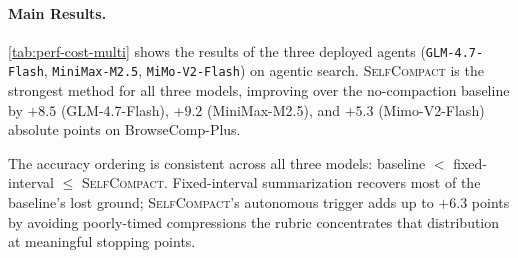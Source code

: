 \documentclass{article}
\newcommand{\method}{\textsc{{SelfCompact}}}
\begin{document}
\paragraph{Main Results.} \autoref{tab:perf-cost-multi} shows the results of the three deployed agents (\texttt{GLM-4.7-Flash}, \texttt{MiniMax-M2.5}, \texttt{MiMo-V2-Flash}) on agentic search. \method{} is the strongest method for all three models, improving over the no-compaction baseline by $+8.5$ (GLM-4.7-Flash), $+9.2$ (MiniMax-M2.5), and $+5.3$
  (Mimo-V2-Flash) absolute points on BrowseComp-Plus.

  The accuracy ordering is consistent across all three models: baseline $<$ fixed-interval $\le$ \method{}.
  Fixed-interval summarization recovers most of the baseline's lost ground; \method{}'s autonomous trigger adds up to $+6.3$ points by avoiding poorly-timed compressions the
   rubric concentrates that distribution at meaningful stopping points.
\end{document}
